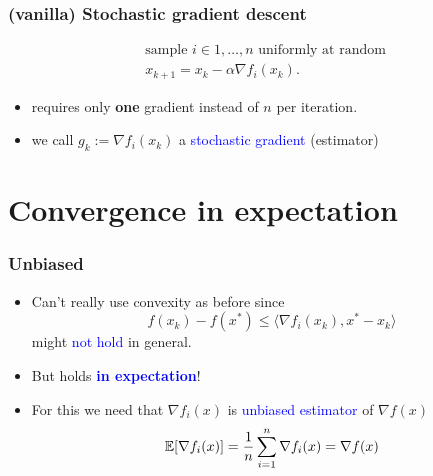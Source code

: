 \documentclass[aspectratio=149]{beamer}
\begin{document}
\begin{frame}
  \frametitle{(vanilla) Stochastic gradient descent}

  \begin{block}{}
    \begin{align}
      &\text{sample $i\in 1,\dots, n$ uniformly at random} \\
      &x_{k+1} = x_k - \alpha \nabla f_i(x_k).
    \end{align}
  \end{block}

  \begin{itemize}
    \item requires only \textbf{one} gradient instead of $n$ per iteration.
    \item we call $g_k := \nabla f_i(x_k)$ a \textcolor{blue}{stochastic gradient} (estimator)
  \end{itemize}
\end{frame}


\section{Convergence in expectation}%
\label{sec:}

\begin{frame}
  \frametitle{Unbiased}
  \begin{itemize}
    \item Can't really use convexity as before since
          \begin{equation}
            f(x_k)-f(x^*) \le \langle \nabla f_i(x_k), x^*-x_k \rangle
          \end{equation}
          might \textcolor{blue}{not hold} in general.
    \item But holds \textcolor{blue}{\textbf{in expectation}}!
    \item For this we need that $\nabla f_i(x)$ is \textcolor{blue}{unbiased estimator} of $\nabla f(x)$
  \begin{equation}
    \mathbb{E} [\nabla f_i(x)] = \frac{1}{n} \sum_{i=1}^{n} \nabla f_i(x) = \nabla f(x)
  \end{equation}
  \end{itemize}
\end{frame}
\end{document}
